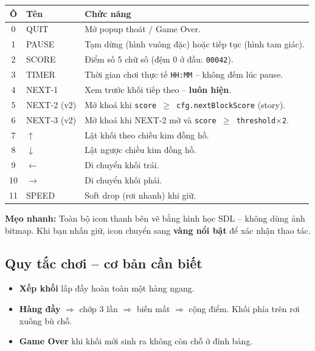 \documentclass[12pt,a4paper]{article}
\renewcommand{\tipbox}[1]{%
  \vspace{4pt}%
  \noindent\colorbox{yellow!18}{\begin{minipage}{0.96\linewidth}%
    \vspace{2pt}\textbf{Mẹo nhanh:} #1\vspace{2pt}%
  \end{minipage}}%
  \vspace{4pt}%
}
\begin{document}
\vspace{4pt}
\begin{tabularx}{\linewidth}{|c|l|X|}
    \hline
    \textbf{Ô} & \textbf{Tên}         & \textbf{Chức năng} \\
    \hline
    0  & QUIT          & Mở popup thoát / Game Over. \\
    \hline
    1  & PAUSE         & Tạm dừng (hình vuông đặc) hoặc tiếp tục (hình tam giác). \\
    \hline
    2  & SCORE         & Điểm số 5 chữ số (đệm 0 ở đầu: \texttt{00042}). \\
    \hline
    3  & TIMER         & Thời gian chơi thực tế \texttt{HH:MM} -- không đếm lúc pause. \\
    \hline
    4  & NEXT-1        & Xem trước khối tiếp theo -- \textbf{luôn hiện}. \\
    \hline
    5  & NEXT-2 (v2)   & Mở khoá khi \texttt{score $\geq$ cfg.nextBlockScore} (story). \\
    \hline
    6  & NEXT-3 (v2)   & Mở khoá khi NEXT-2 mở và \texttt{score $\geq$ threshold$\times$2}. \\
    \hline
    7  & $\uparrow$    & Lật khối theo chiều kim đồng hồ. \\
    \hline
    8  & $\downarrow$  & Lật ngược chiều kim đồng hồ. \\
    \hline
    9  & $\leftarrow$  & Di chuyển khối trái. \\
    \hline
    10 & $\rightarrow$ & Di chuyển khối phải. \\
    \hline
    11 & SPEED         & Soft drop (rơi nhanh) khi giữ. \\
    \hline
\end{tabularx}

\tipbox{Toàn bộ icon thanh bên vẽ bằng hình học SDL -- không dùng ảnh bitmap.
Khi bạn nhấn giữ, icon chuyển sang \textbf{vàng nổi bật} để xác nhận thao tác.}

\subsection{Quy tắc chơi -- cơ bản cần biết}

\begin{itemize}
    \item \textbf{Xếp khối} lấp đầy hoàn toàn một hàng ngang.
    \item \textbf{Hàng đầy} $\Rightarrow$ chớp 3 lần $\Rightarrow$ biến mất
          $\Rightarrow$ cộng điểm. Khối phía trên rơi xuống bù chỗ.
    \item \textbf{Game Over} khi khối mới sinh ra không còn chỗ ở đỉnh bảng.
\end{itemize}
\end{document}

